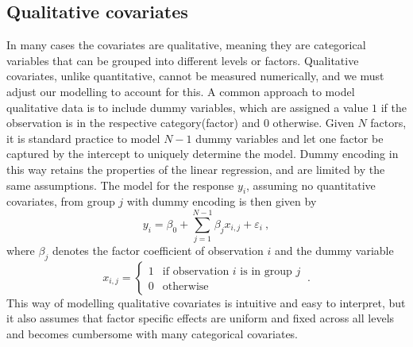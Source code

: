 \subsection{Qualitative covariates}
\label{sec:qualitative}
In many cases the covariates are qualitative, meaning they are categorical variables that can be grouped into different levels or factors.
Qualitative covariates, unlike quantitative, cannot be measured numerically, and we must adjust our modelling to account for this.
A common approach to model qualitative data is to include dummy variables, which are assigned a value $1$ if the observation is in the respective category(factor) and $0$ otherwise.
Given $N$ factors, it is standard practice to model $N-1$ dummy variables and let one factor be captured by the intercept to uniquely determine the model.
Dummy encoding in this way retains the properties of the linear regression, and are limited by the same assumptions.
The model for the response $y_i$, assuming no quantitative covariates, from group $j$ with dummy encoding is then given by
\begin{equation}
    y_i =  \beta_0 + \sum_{j=1}^{N-1} \beta_j x_{i,j} + \varepsilon_i \ ,
\end{equation}
where $\beta_j$ denotes the factor coefficient of observation $i$ and the dummy variable
\begin{equation}
    x_{i,j} = \begin{cases}
        1 & \text{if observation $i$ is in group $j$} \\
        0 & \text{otherwise}
    \end{cases} \ .
\end{equation}
This way of modelling qualitative covariates is intuitive and easy to interpret, but it also assumes that factor specific effects are uniform and fixed across all levels and becomes cumbersome with many categorical covariates. 

